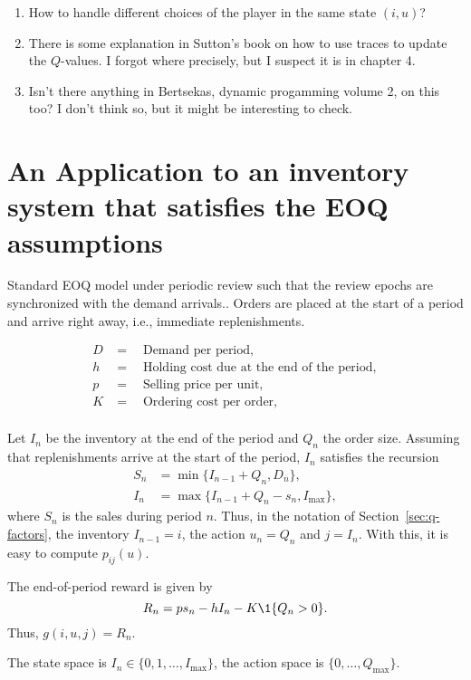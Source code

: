 \documentclass{article}
\begin{document}
\begin{enumerate}
\item How to handle different choices of the player in the same state $(i,u)$? 
\item There is some explanation in Sutton's book on how to use traces to update the $Q$-values. I forgot where precisely, but I suspect it is in chapter 4.
\item Isn't there anything in Bertsekas, dynamic progamming volume 2,  on this too? I don't think so, but it might be interesting to check.
\end{enumerate}


\section{An Application to an inventory system that satisfies the EOQ assumptions}


Standard EOQ model under periodic review such that the review epochs are synchronized with the demand arrivals.. Orders are placed at the
start of a period and arrive right away, i.e., immediate replenishments.

\begin{align*}
  D&= \quad \text{Demand per period},\\
  h&= \quad \text{Holding cost due at the end of the period},\\
  p&= \quad \text{Selling price per unit},\\
  K&= \quad \text{Ordering cost per order},\\
\end{align*}

Let $I_n$ be the inventory at the end of the period and $Q_n$ the order size. Assuming that replenishments arrive at the start of the period, $I_n$ satisfies the recursion
\begin{align*}
S_n&=\min\{I_{n-1} + Q_n, D_n\}, \\
I_n&=\max\{I_{n-1}+Q_n - s_n, I_{\max}\}, 
\end{align*}
where $S_n$ is the sales during period $n$.
Thus, in the notation of Section~\ref{sec:q-factors},  the inventory $I_{n-1}=i$, the action  
$u_n=Q_n$ and  $j=I_n$. With this, it is easy to compute $p_{ij}(u)$. 

The end-of-period reward is given by
\begin{equation*}
 R_n = p s_n - h I_n - K \1{Q_n > 0}.
\end{equation*}
Thus, $g(i,u, j) = R_n$.

The state space is  $I_n \in \{0, 1, \ldots, I_{\max}\}$, the action space is $\{0, \ldots, Q_{\max}\}$. 
\end{document}
